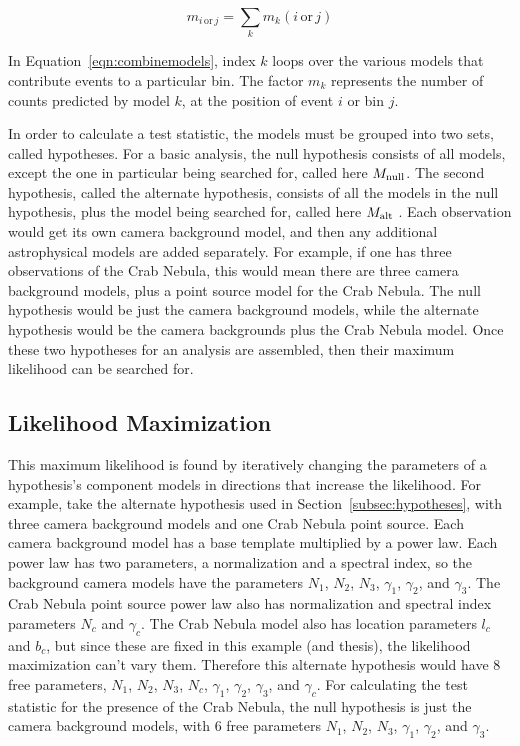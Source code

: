   \begin{equation}\label{eqn:combinemodels}
    m_{i\,\textrm{or}\,j} = \sum_k m_k(i\,\textrm{or}\,j)
  \end{equation}

  In Equation~\ref{eqn:combinemodels}, index $k$ loops over the various models that contribute events to a particular bin.
  The factor $m_k$ represents the number of counts predicted by model $k$, at the position of event $i$ or bin $j$.
  
  In order to calculate a test statistic, the models must be grouped into two sets, called hypotheses.
  For a basic analysis, the null hypothesis consists of all models, except the one in particular being searched for, called here $M_\textrm{null}$.
  The second hypothesis, called the alternate hypothesis, consists of all the models in the null hypothesis, plus the model being searched for, called here $M_\textrm{alt }$.
  Each observation would get its own camera background model, and then any additional astrophysical models are added separately.
  For example, if one has three observations of the Crab Nebula, this would mean there are three camera background models, plus a point source model for the Crab Nebula.
  The null hypothesis would be just the camera background models, while the alternate hypothesis would be the camera backgrounds plus the Crab Nebula model.
  Once these two hypotheses for an analysis are assembled, then their maximum likelihood can be searched for.
  
  \subsection{Likelihood Maximization}\label{subsec:likemax}
  This maximum likelihood is found by iteratively changing the parameters of a hypothesis's component models in directions that increase the likelihood.
  For example, take the alternate hypothesis used in Section~\ref{subsec:hypotheses}, with three camera background models and one Crab Nebula point source.
  Each camera background model has a base template multiplied by a power law.
  Each power law has two parameters, a normalization and a spectral index, so the background camera models have the parameters $N_1$, $N_2$, $N_3$, $\gamma_1$, $\gamma_2$, and $\gamma_3$.
  The Crab Nebula point source power law also has normalization and spectral index parameters $N_c$ and $\gamma_c$.
  The Crab Nebula model also has location parameters $l_c$ and $b_c$, but since these are fixed in this example (and thesis), the likelihood maximization can't vary them.
  Therefore this alternate hypothesis would have 8 free parameters, $N_1$, $N_2$, $N_3$, $N_c$, $\gamma_1$, $\gamma_2$, $\gamma_3$, and $\gamma_c$.
  For calculating the test statistic for the presence of the Crab Nebula, the null hypothesis is just the camera background models, with 6 free parameters $N_1$, $N_2$, $N_3$, $\gamma_1$, $\gamma_2$, and $\gamma_3$.
  

